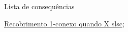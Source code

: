 \begin{titlemize}{Lista de consequências}
	\item \hyperref[recobrimento-1-conexo-prop]{Recobrimento 1-conexo quando X slsc};\\ %
\end{titlemize}


